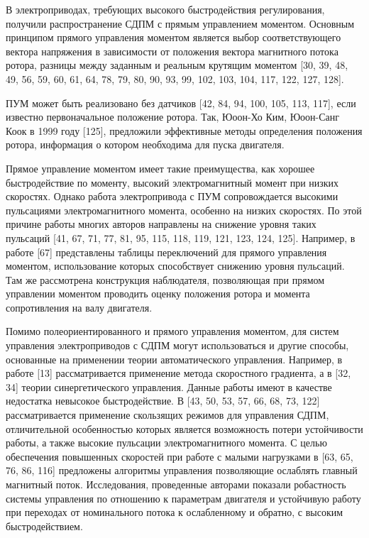 В электроприводах, требующих высокого быстродействия регулирования, получили распространение СДПМ с прямым управлением моментом. Основным принципом прямого управления моментом является выбор соответствующего вектора напряжения в зависимости от положения вектора магнитного потока ротора, разницы между заданным и реальным крутящим моментом [30, 39, 48, 49, 56, 59, 60, 61, 64, 78, 79, 80, 90, 93, 99, 102, 103, 104, 117, 122, 127, 128].

ПУМ может быть реализовано без датчиков [42, 84, 94, 100, 105, 113, 117], если известно первоначальное положение ротора. Так, Юоон-Хо Ким, Юоон-Санг Коок в 1999 году [125], предложили эффективные методы определения положения ротора, информация о котором необходима для пуска двигателя.

Прямое управление моментом имеет такие преимущества, как хорошее быстродействие по моменту, высокий электромагнитный момент при низких скоростях. Однако работа электропривода с ПУМ сопровождается высокими пульсациями электромагнитного момента, особенно на низких скоростях. По этой причине работы многих авторов направлены на снижение уровня таких пульсаций [41, 67, 71, 77, 81, 95, 115, 118, 119, 121, 123, 124, 125]. Например, в работе [67] представлены таблицы переключений для прямого управления моментом, использование которых способствует снижению уровня пульсаций. Там же рассмотрена конструкция наблюдателя, позволяющая при прямом управлении моментом проводить оценку положения ротора и момента сопротивления на валу двигателя. 

Помимо полеориентированного и прямого управления моментом, для систем управления электроприводов с СДПМ могут использоваться и другие способы, основанные на применении теории автоматического управления. Например, в работе [13] рассматривается применение метода скоростного градиента, а в [32, 34] теории синергетического управления. Данные работы имеют в качестве недостатка невысокое быстродействие. В [43, 50, 53, 57, 66, 68, 73, 122] рассматривается применение скользящих режимов для управления СДПМ, отличительной особенностью которых является возможность потери устойчивости работы, а также высокие пульсации электромагнитного момента. 
С целью обеспечения повышенных скоростей при работе с малыми нагрузками в [63, 65, 76, 86, 116] предложены алгоритмы управления позволяющие ослаблять главный магнитный поток. Исследования, проведенные авторами показали робастность системы управления по отношению к параметрам двигателя и устойчивую работу при переходах от номинального потока к ослабленному и обратно, с высоким быстродействием. 

